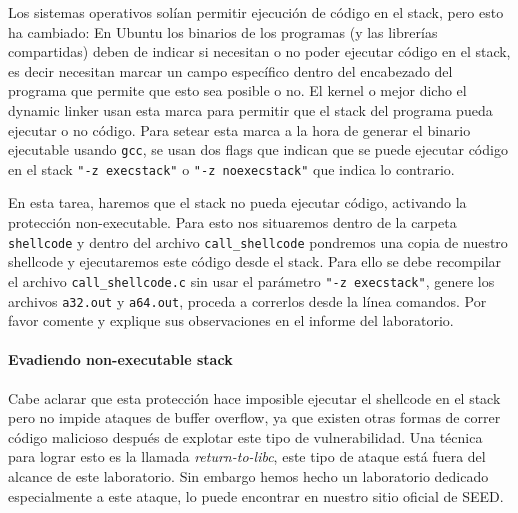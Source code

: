 
Los sistemas operativos solían permitir ejecución de código en el stack, pero esto ha cambiado: En Ubuntu los binarios de los programas (y las librerías compartidas) deben de indicar si necesitan o no poder ejecutar código en el stack, es decir necesitan marcar un campo específico dentro del encabezado del programa que permite que esto sea posible o no. El kernel o mejor dicho el dynamic linker usan esta marca para permitir que el stack del programa pueda ejecutar o no código. Para setear esta marca a la hora de generar el binario ejecutable usando \texttt{gcc}, se usan dos flags que indican que se puede ejecutar código en el stack \texttt{"-z execstack"} o \texttt{"-z noexecstack"} que indica lo contrario.

En esta tarea, haremos que el stack no pueda ejecutar código, activando la protección non-executable. Para esto nos situaremos dentro de la carpeta \texttt{shellcode} y dentro del archivo \texttt{call\_shellcode} pondremos una copia de nuestro shellcode y ejecutaremos este código desde el stack.
Para ello se debe recompilar el archivo \texttt{call\_shellcode.c} sin usar el parámetro \texttt{"-z execstack"}, genere los archivos \texttt{a32.out} y \texttt{a64.out}, proceda a correrlos desde la línea comandos.
Por favor comente y explique sus observaciones en el informe del laboratorio.


\paragraph{Evadiendo non-executable stack}
Cabe aclarar que esta protección hace imposible ejecutar el shellcode en el stack pero no impide ataques de buffer overflow, ya que existen otras formas de correr código malicioso después de explotar este tipo de vulnerabilidad. Una técnica para lograr esto es la llamada {\em return-to-libc}, este tipo de ataque está fuera del alcance de este laboratorio. Sin embargo hemos hecho un laboratorio dedicado especialmente a este ataque, lo puede encontrar en nuestro sitio oficial de SEED.


